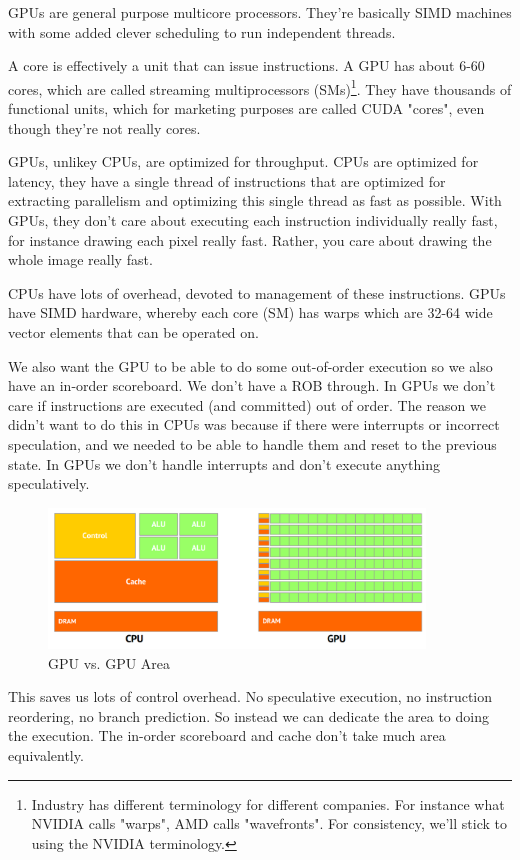 \documentclass{article}
\begin{document}
GPUs are general purpose multicore processors. They're basically SIMD machines with some added clever scheduling to run independent threads. 

A core is effectively a unit that can issue instructions. A GPU has about 6-60 cores, which are called streaming multiprocessors (SMs)\footnote{Industry has different terminology for different companies. For instance what NVIDIA calls "warps", AMD calls "wavefronts". For consistency, we'll stick to using the NVIDIA terminology.}. They have thousands of functional units, which for marketing purposes are called CUDA "cores", even though they're not really cores.

GPUs, unlikey CPUs, are optimized for throughput. CPUs are optimized for latency, they have a single thread of instructions that are optimized for extracting parallelism and optimizing this single thread as fast as possible. With GPUs, they don't care about executing each instruction individually really fast, for instance drawing each pixel really fast. Rather, you care about drawing the whole image really fast.

CPUs have lots of overhead, devoted to management of these instructions. GPUs have SIMD hardware, whereby each core (SM) has warps which are 32-64 wide vector elements that can be operated on. 

We also want the GPU to be able to do some out-of-order execution so we also have an in-order scoreboard. We don't have a ROB through. In GPUs we don't care if instructions are executed (and committed) out of order. The reason we didn't want to do this in CPUs was because if there were interrupts or incorrect speculation, and we needed to be able to handle them and reset to the previous state. In GPUs we don't handle interrupts and don't execute anything speculatively. 


 \begin{figure}[ht!]
\centering
\includegraphics[width=100mm]{img/CPUvsGPU.png}
\caption{GPU vs. GPU Area}
\end{figure}

This saves us lots of control overhead. No speculative execution, no instruction reordering, no branch prediction. So instead we can dedicate the area to doing the execution. The in-order scoreboard and cache don't take much area equivalently.
\end{document}
